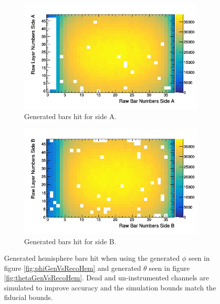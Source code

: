 \begin{figure}[htbp]
\centering
\begin{subfigure}{.5\textwidth}
  \centering
  \includegraphics[width=\linewidth]{Chapter5/Figs/Raster/rawHemisphereFiducialBarsSideA.png}
  \captionsetup{width=.9\linewidth}
  \caption{Generated bars hit for side A.}
  \label{subFig:rawHemisphereFiducialBarsSideA}
\end{subfigure}%
\begin{subfigure}{.5\textwidth}
  \centering
\includegraphics[width=\linewidth]{Chapter5/Figs/Raster/rawHemisphereFiducialBarsSideB.png}
  \captionsetup{width=.9\linewidth}
  \caption{Generated bars hit for side B.}
  \label{subFig:rawHemisphereFiducialBarsSideB}
\end{subfigure}
\caption{Generated hemisphere bars hit when using the generated $\phi$ seen in figure \ref{fig:phiGenVsRecoHem} and generated $\theta$ seen in figure \ref{fig:thetaGenVsRecoHem}. Dead and un-instrumented channels are simulated to improve accuracy and the simulation bounds match the fiducial bounds.}
\label{fig:rawHemisphereFiducialBarsSideAB}
\end{figure}

